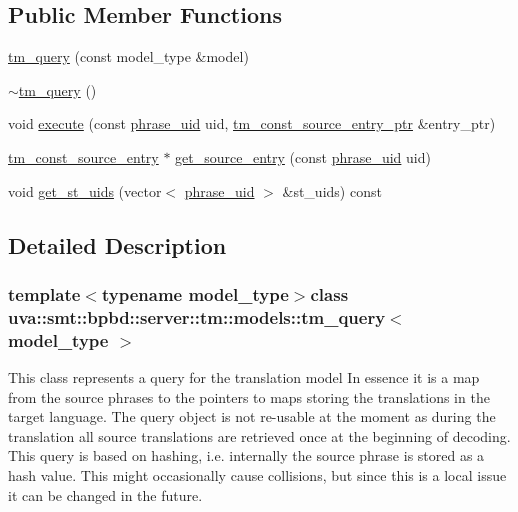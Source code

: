 \subsection*{Public Member Functions}
\begin{DoxyCompactItemize}
\item 
\hyperlink{classuva_1_1smt_1_1bpbd_1_1server_1_1tm_1_1models_1_1tm__query_a8735b989bcadf6cbeabf41c22240beda}{tm\+\_\+query} (const model\+\_\+type \&model)
\item 
\hyperlink{classuva_1_1smt_1_1bpbd_1_1server_1_1tm_1_1models_1_1tm__query_a6fd3878559722341e04732e48595a050}{$\sim$tm\+\_\+query} ()
\item 
void \hyperlink{classuva_1_1smt_1_1bpbd_1_1server_1_1tm_1_1models_1_1tm__query_a0c93b738f0b13d88c9d081a1ac76641d}{execute} (const \hyperlink{namespaceuva_1_1smt_1_1bpbd_1_1server_ad18d4cdf5504e76c22b0c124ff60b44f}{phrase\+\_\+uid} uid, \hyperlink{namespaceuva_1_1smt_1_1bpbd_1_1server_1_1tm_1_1models_a841bb11e4e9f70fbde7a8ca1ae533681}{tm\+\_\+const\+\_\+source\+\_\+entry\+\_\+ptr} \&entry\+\_\+ptr)
\item 
\hyperlink{namespaceuva_1_1smt_1_1bpbd_1_1server_1_1tm_1_1models_a86b26049fe9aeb13a850852d897a2a77}{tm\+\_\+const\+\_\+source\+\_\+entry} $\ast$ \hyperlink{classuva_1_1smt_1_1bpbd_1_1server_1_1tm_1_1models_1_1tm__query_a9ac4dd7a24c9b600ac4fa8df0a9ef2d8}{get\+\_\+source\+\_\+entry} (const \hyperlink{namespaceuva_1_1smt_1_1bpbd_1_1server_ad18d4cdf5504e76c22b0c124ff60b44f}{phrase\+\_\+uid} uid)
\item 
void \hyperlink{classuva_1_1smt_1_1bpbd_1_1server_1_1tm_1_1models_1_1tm__query_a99f13c4bc5b7ff5529a37a283db43c7f}{get\+\_\+st\+\_\+uids} (vector$<$ \hyperlink{namespaceuva_1_1smt_1_1bpbd_1_1server_ad18d4cdf5504e76c22b0c124ff60b44f}{phrase\+\_\+uid} $>$ \&st\+\_\+uids) const 
\end{DoxyCompactItemize}


\subsection{Detailed Description}
\subsubsection*{template$<$typename model\+\_\+type$>$class uva\+::smt\+::bpbd\+::server\+::tm\+::models\+::tm\+\_\+query$<$ model\+\_\+type $>$}

This class represents a query for the translation model In essence it is a map from the source phrases to the pointers to maps storing the translations in the target language. The query object is not re-\/usable at the moment as during the translation all source translations are retrieved once at the beginning of decoding. This query is based on hashing, i.\+e. internally the source phrase is stored as a hash value. This might occasionally cause collisions, but since this is a local issue it can be changed in the future. 

